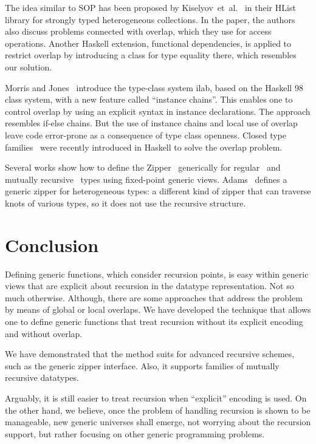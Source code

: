 \documentclass[runningheads]{llncs}
\begin{document}
The idea similar to SOP has been proposed by Kiselyov~et~al.~\cite{Kiselyov2004} in their \textsf{HList} library for strongly typed heterogeneous collections. In the paper, the authors also discuss problems connected with overlap, which they use for access operations. Another Haskell extension, functional dependencies, is applied to restrict overlap by introducing a class for type equality there, which resembles our solution.

Morris and Jones~\cite{Morris2010} introduce the type-class system \textsf{ilab}, based on the Haskell 98 class system, with a new feature called ``instance chains''. This enables one to control overlap by using an explicit syntax in instance declarations. The approach resembles if-else chains. But the use of instance chains and local use of overlap leave code error-prone as a consequence of type class openness. Closed type families~\cite{Eisenberg2014} were recently introduced in Haskell to solve the overlap problem.

Several works show how to define the Zipper~\cite{Huet1997} generically for regular~\cite{HiJeLo2004,McBride2001} and mutually recursive~\cite{MuRec2009} types using fixed-point generic views. Adams~\cite{Adams2010} defines a generic zipper for heterogeneous types: a different kind of zipper that can traverse knots of various types, so it does not use the recursive structure.



\section{Conclusion}
\label{sec:conclusion}

Defining generic functions, which consider recursion points, is easy within generic views that are explicit about recursion in the datatype representation. Not so much otherwise. Although, there are some approaches that address the problem by means of global or local overlaps. We have developed the technique that allows one to define generic functions that treat recursion without its explicit encoding and without overlap. 

We have demonstrated that the method suits for advanced recursive schemes, such as the generic zipper interface. Also, it supports families of mutually recursive datatypes.

Arguably, it is still easier to treat recursion when ``explicit'' encoding is used. On the other hand, we believe, once the problem of handling recursion is shown to be manageable, new generic universes shall emerge, not worrying about the recursion support, but rather focusing on other generic programming problems.
\end{document}
